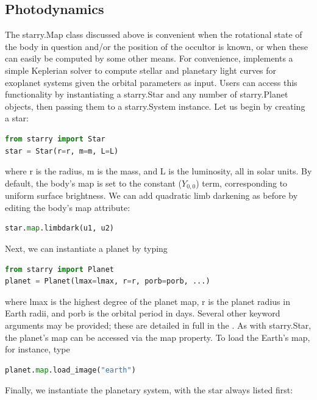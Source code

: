 \documentclass[modern]{aastex61}
\begin{document}
\subsection{Photodynamics}
\label{sec:starryphotodynamics}

The \textsf{starry.Map} class discussed above is convenient when the rotational
state of the body in question and/or the position of the occultor is known,
or when these can easily be computed by some other means. For convenience,
\starry implements a simple Keplerian solver to compute stellar and
planetary light curves for exoplanet systems given the orbital parameters as
input. Users can access this functionality by instantiating a
\textsf{starry.Star} and any number of \textsf{starry.Planet} objects, then
passing them to a \textsf{starry.System} instance. Let us begin by
creating a star:
%
\begin{lstlisting}[language=Python,firstnumber=last]
from starry import Star
star = Star(r=r, m=m, L=L)
\end{lstlisting}
%
where \textsf{r} is the radius, \textsf{m} is the mass, and \textsf{L} is
the luminosity, all in solar units. By default, the body's map is set to
the constant ($Y_{0,0}$) term, corresponding to uniform surface brightness.
We can add quadratic limb darkening as before by editing the body's \textsf{map}
attribute:
%
\begin{lstlisting}[language=Python,firstnumber=last]
star.map.limbdark(u1, u2)
\end{lstlisting}
%
Next, we can instantiate a planet by typing
%
\begin{lstlisting}[language=Python,firstnumber=last]
from starry import Planet
planet = Planet(lmax=lmax, r=r, porb=porb, ...)
\end{lstlisting}
%
where \textsf{lmax} is the highest degree of the planet map, \textsf{r} is the
planet radius in Earth radii, and \textsf{porb} is the orbital period in days.
Several other keyword arguments may be provided; these are detailed in full
in the \docs. As with \textsf{starry.Star}, the planet's map can be accessed
via the \textsf{map} property. To load the Earth's map, for instance, type
%
\begin{lstlisting}[language=Python,firstnumber=last]
planet.map.load_image("earth")
\end{lstlisting}
%
Finally, we instantiate the planetary system, with the star always listed first:
\end{document}
